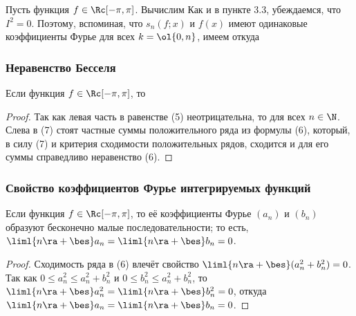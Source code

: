 \documentclass[a4paper]{article}
\begin{document}
Пусть функция $f\in\Rc[-\pi,\pi]$. Вычислим  Как и в пункте 3.3,
убеждаемся, что $I^2=0$. Поэтому, вспоминая, что $s_n(f;x)$ и $f(x)$
имеют одинаковые коэффициенты Фурье для всех $k=\ol{0,n}$, имеем
 откуда 

\subsubsection{Неравенство Бесселя}

\begin{theorem}
Если функция $f\in\Rc[-\pi,\pi]$, то 
\end{theorem}

\begin{proof}
Так как левая часть в равенстве (5) неотрицательна, то
 для всех $n\in\N$. Слева в (7) стоят
частные суммы положительного ряда из формулы (6), который, в силу
(7) и критерия сходимости положительных рядов, сходится и для его
суммы справедливо неравенство (6).
\end{proof}

\subsubsection{Свойство коэффициентов Фурье интегрируемых функций}

\begin{theorem}
Если функция $f\in\Rc[-\pi,\pi]$, то её коэффициенты Фурье $(a_n)$ и
$(b_n)$ образуют бесконечно малые последовательности; то есть,
$\liml{n\ra+\bes} a_n = \liml{n\ra+\bes} b_n = 0$.
\end{theorem}

\begin{proof}
Сходимость ряда в (6) влечёт свойство $\liml{n\ra+\bes} (a_n^2 +
b_n^2)=0$. Так как $0\le a_n^2 \le a_n^2 + b_n^2$ и $0\le b_n^2 \le
a_n^2 + b_n^2$, то $\liml{n\ra+\bes} a_n^2 = \liml{n\ra+\bes} b_n^2=
0$, откуда $\liml{n\ra+\bes} a_n = \liml{n\ra+\bes} b_n = 0$.
\end{proof}
\end{document}
